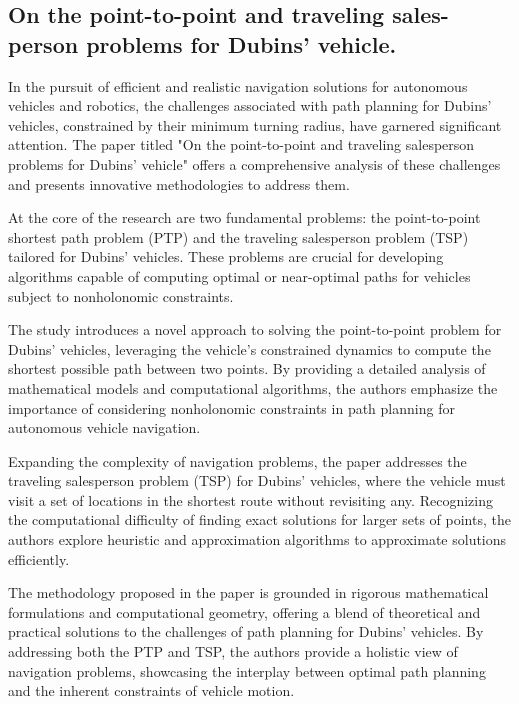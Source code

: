 \vspace*{6mm}

\subsection{On the point-to-point and traveling sales-
person problems for Dubins’ vehicle.}


In the pursuit of efficient and realistic navigation solutions for autonomous vehicles and robotics, the challenges associated with path planning for Dubins' vehicles, constrained by their minimum turning radius, have garnered significant attention. The paper titled "On the point-to-point and traveling salesperson problems for Dubins’ vehicle" offers a comprehensive analysis of these challenges and presents innovative methodologies to address them.

\vspace*{6mm}

At the core of the research are two fundamental problems: the point-to-point shortest path problem (PTP) and the traveling salesperson problem (TSP) tailored for Dubins’ vehicles. These problems are crucial for developing algorithms capable of computing optimal or near-optimal paths for vehicles subject to nonholonomic constraints.

\vspace*{6mm}

The study introduces a novel approach to solving the point-to-point problem for Dubins’ vehicles, leveraging the vehicle’s constrained dynamics to compute the shortest possible path between two points. By providing a detailed analysis of mathematical models and computational algorithms, the authors emphasize the importance of considering nonholonomic constraints in path planning for autonomous vehicle navigation.

\vspace*{6mm}

Expanding the complexity of navigation problems, the paper addresses the traveling salesperson problem (TSP) for Dubins’ vehicles, where the vehicle must visit a set of locations in the shortest route without revisiting any. Recognizing the computational difficulty of finding exact solutions for larger sets of points, the authors explore heuristic and approximation algorithms to approximate solutions efficiently.

\vspace*{6mm}

The methodology proposed in the paper is grounded in rigorous mathematical formulations and computational geometry, offering a blend of theoretical and practical solutions to the challenges of path planning for Dubins’ vehicles. By addressing both the PTP and TSP, the authors provide a holistic view of navigation problems, showcasing the interplay between optimal path planning and the inherent constraints of vehicle motion.

